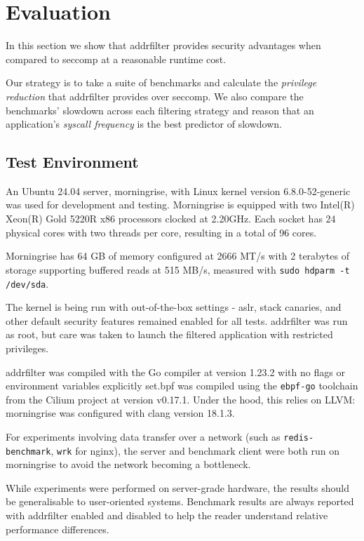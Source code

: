 \section{Evaluation}

In this section we show that addrfilter provides security advantages when
compared to seccomp at a reasonable runtime cost. 

Our strategy is to take a suite of benchmarks and calculate the
\textit{privilege reduction} that addrfilter provides over seccomp. We also
compare the benchmarks' slowdown across each filtering strategy and reason that
an application's \textit{syscall frequency} is the best predictor of slowdown. 

\subsection{Test Environment}

An Ubuntu 24.04 server, morningrise, with Linux kernel version
6.8.0-52-generic was used for development and testing. 
Morningrise is equipped with two Intel(R) Xeon(R) Gold 5220R x86 processors
clocked at 2.20GHz. Each socket has 24 physical cores with two threads per
core, resulting in a total of 96 cores.

Morningrise has 64 GB of memory configured at 2666 MT/s  with 2 terabytes
of storage supporting buffered reads at 515 MB/s,
measured with \texttt{sudo hdparm -t /dev/sda}.

The kernel is being run with out-of-the-box settings - \ac{aslr}, stack
canaries, and other default security features remained enabled for all tests.
addrfilter was run as root, but care was taken to launch the filtered
application with restricted privileges.

addrfilter was compiled with the Go compiler at version 1.23.2 with no flags or
environment variables explicitly set.\ac{bpf} was
compiled using the \texttt{ebpf-go} toolchain from the Cilium project at version
v0.17.1. Under the hood, this relies on LLVM: morningrise was configured with
clang version 18.1.3. 

For experiments involving data transfer over a network (such as
\texttt{redis-benchmark}, \texttt{wrk} for nginx), the server and benchmark
client were both run on morningrise to avoid the network becoming a bottleneck.

While experiments were performed on server-grade hardware, the results should be
generalisable to user-oriented systems. Benchmark results are always reported
with addrfilter enabled and disabled to help the reader understand relative
performance differences.

